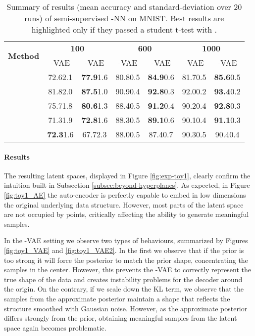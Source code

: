 \documentclass[letterpaper]{article}
\newcommand{\Nv}{}
\begin{document}
\begin{table*}[!ht]
  \centering
  \caption{Summary of results (mean accuracy and standard-deviation over 20 runs) of semi-supervised -NN on MNIST. Best results are highlighted only if they passed a student t-test with .}
  \bigskip
  \begin{tabular}{l|cc|cc|cc}
    \toprule
    \multirow{2}{*}{\textbf{Method}} &
    \multicolumn{2}{c}{\textbf{100}} &
    \multicolumn{2}{c}{\textbf{600}} &
    \multicolumn{2}{c}{\textbf{1000}}
        \\
        & -VAE & -VAE & -VAE & -VAE & -VAE & -VAE \\
    \midrule
&72.6{\tiny2.1}&\textbf{77.9}{\tiny1.6}&80.8{\tiny0.5}&\textbf{84.9}{\tiny0.6}&81.7{\tiny0.5}&\textbf{85.6}{\tiny0.5}\\
&81.8{\tiny2.0}&\textbf{87.5}{\tiny1.0}&90.9{\tiny0.4}&\textbf{92.8}{\tiny0.3}&92.0{\tiny0.2}&\textbf{93.4}{\tiny0.2}\\
&75.7{\tiny1.8}&\textbf{80.6}{\tiny1.3}&88.4{\tiny0.5}&\textbf{91.2}{\tiny0.4}&90.2{\tiny0.4}&\textbf{92.8}{\tiny0.3}\\
&71.3{\tiny1.9}&\textbf{72.8}{\tiny1.6}&88.3{\tiny0.5}&\textbf{89.1}{\tiny0.6}&90.1{\tiny0.4}&\textbf{91.1}{\tiny0.3}\\
&\textbf{72.3}{\tiny1.6}&67.7{\tiny2.3}&88.0{\tiny0.5}&87.4{\tiny0.7}&90.3{\tiny0.5}&90.4{\tiny0.4}\\
    \bottomrule
    \end{tabular}
  \label{tab:m1_k5_a}
\end{table*}


\paragraph{Results}
The resulting latent spaces, displayed in Figure \ref{fig:exp-toy1}, clearly confirm the intuition built in Subsection \ref{subsec:beyond-hyperplanes}. As expected, in Figure \ref{fig:toy1_AE} the auto-encoder is perfectly capable to embed in low dimensions the original underlying data structure. However, most parts of the latent space are not occupied by points, critically affecting the ability to generate meaningful samples.

In the \Nv-VAE setting we observe two types of behaviours, summarized by Figures \ref{fig:toy1_VAE} and  \ref{fig:toy1_VAE2}. In the first we observe that if the prior is too strong it will force the posterior to match the prior shape, concentrating the samples in the center. However, this prevents the \Nv-VAE to correctly represent the true shape of the data and creates instability problems for the decoder around the origin. On the contrary, if we scale down the KL term, we observe that the samples from the approximate posterior maintain a shape that reflects the  structure smoothed with Gaussian noise. However, as the approximate posterior differs strongly from the prior, obtaining meaningful samples from the latent space again becomes problematic. 
\end{document}
